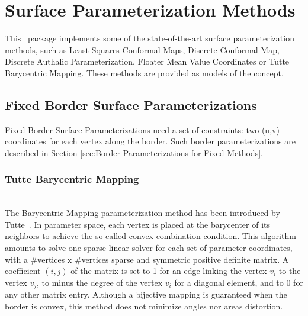 \section{Surface Parameterization Methods}
\label{sec:Surface-Parameterization-Methods}

This \cgal\ package implements some of the state-of-the-art
surface parameterization methods, such as Least Squares Conformal Maps,
Discrete Conformal Map, Discrete Authalic
Parameterization, Floater Mean Value Coordinates or Tutte Barycentric
Mapping. These methods are provided as models of the
 concept.


\subsection{Fixed Border Surface Parameterizations}

Fixed Border Surface Parameterizations need a set of constraints: two
(u,v) coordinates for each vertex along the border.
Such border parameterizations are described in Section
\ref{sec:Border-Parameterizations-for-Fixed-Methods}.

\subsubsection{Tutte Barycentric Mapping}

  \\

The Barycentric Mapping parameterization method has been introduced by
Tutte~\cite{t-hdg-63}. In parameter space, each vertex is
placed at the barycenter of its neighbors to achieve the so-called
convex combination condition. This algorithm amounts to solve one
sparse linear solver for each set of parameter coordinates, with a
\#vertices x \#vertices sparse and symmetric positive definite matrix.
A coefficient $(i, j)$ of the matrix is set to 1 for an edge linking
the vertex $v_i$ to the vertex $v_j$, to minus the degree of the
vertex $v_i$ for a diagonal element, and to 0 for any other matrix
entry. Although a bijective mapping is guaranteed when the border is convex, this method does not minimize angles nor areas distortion.

